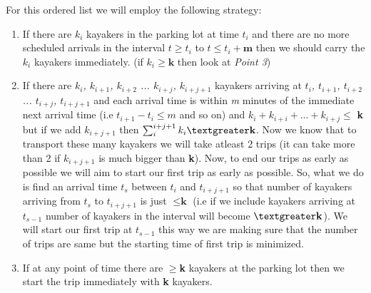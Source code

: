 \documentclass[8pt]{article}
\begin{document}
For this ordered list we will employ the following strategy:
\begin{enumerate}
    \item If there are \textit{$k_i$} kayakers in the parking lot at time \textit{$t_i$} and there are no more scheduled arrivals in the interval \textit{$t \geq t_i$} to \textit{$t \leq t_i + \textbf{m}$} then we should carry the \textit{$k_i$} kayakers immediately. (if $ k_i \geq \textbf{k}$ then look at \textit{Point 3})
    \item If there are \textit{$k_i$, $k_{i+1}$, $k_{i+2}$ ... $k_{i+j}$, $k_{i+j+1}$} kayakers arriving at \textit{$t_i$, $t_{i+1}$, $t_{i+2}$ ... $t_{i+j}$, $t_{i+j+1}$} and each arrival time is within \textit{m} minutes of the immediate next arrival time (i.e  \textit{$t_{i+1} - t_i \leq m$} and so on) and $k_i + k_{i+i} + ... + k_{i+j} \leq$ \textbf{k} but if we add $k_{i+j+1}$ then $\sum_{i}^{i+j+1} k_i \textgreater \textbf{k}$. Now we know that to transport these many kayakers we will take atleast 2 trips (it can take more than 2 if \textit{$k_{i+j+1}$} is much bigger than \textbf{k}). Now, to end our trips as early as possible we will aim to start our first trip as early as possible. So, what we do is find an arrival time \textit{$t_{s}$} between \textit{$t_i$} and \textit{$t_{i+j+1}$} so that number of kayakers arriving from \textit{$t_s$} to \textit{$t_{i+j+1}$} is just $\leq \textbf{k}$ (i.e if we include kayakers arriving at \textit{$t_{s-1}$} number of kayakers in the interval will become $\textgreater \textbf{k}$). We will start our first trip at \textit{$t_{s-1}$} this way we are making sure that the number of trips are same but the starting time of first trip is minimized.
    \item If at any point of time there are $\geq$\textbf{k} kayakers at the parking lot then we start the trip immediately with \textbf{k} kayakers.
\end{enumerate}
\end{document}
